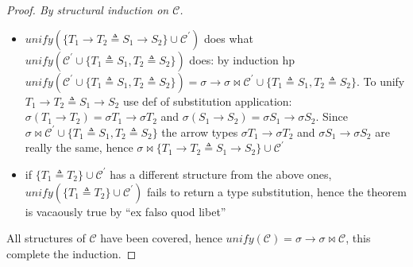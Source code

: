 \documentclass[8pt]{beamer}
\begin{document}
\begin{frame}
\begin{proof}[Proof. By structural induction on $\mathcal{C}$]
\begin{itemize}
            \item $unify(\{T_1 \rightarrow T_2 \triangleq 
                S_1\rightarrow S_2 \} \cup \mathcal{C}^{\prime})$ 
                does what
                $unify(\mathcal{C}^{\prime} \cup \{T_1 \triangleq S_1,
                    T_2 \triangleq S_2\})$ does: by induction hp 
                    $unify(\mathcal{C}^{\prime} \cup \{T_1 \triangleq S_1,
                    T_2 \triangleq S_2\}) = \sigma \rightarrow 
                    \sigma \Join
                    \mathcal{C}^{\prime} \cup \{T_1 \triangleq S_1,
                    T_2 \triangleq S_2\}$. To unify $T_1 \rightarrow 
                    T_2 \triangleq S_1\rightarrow S_2 $ use def of 
                    substitution application: $\sigma 
                    (T_1 \rightarrow T_2 ) = \sigma T_1 \rightarrow 
                    \sigma T_2$ and  $\sigma 
                    (S_1 \rightarrow S_2 ) = \sigma S_1 \rightarrow 
                    \sigma S_2$. Since $\sigma \Join
                    \mathcal{C}^{\prime} \cup \{T_1 \triangleq S_1,
                    T_2 \triangleq S_2\}$ the arrow types 
                    $\sigma T_1 \rightarrow \sigma T_2$ and
                    $\sigma S_1 \rightarrow \sigma S_2$ are really the
                    same, hence
                    $\sigma \Join \{T_1 \rightarrow T_2 \triangleq 
                    S_1\rightarrow S_2 \} \cup \mathcal{C}^{\prime}$
                    
                    \item if $\{T_1 \triangleq T_2\} \cup \mathcal{C}
                        ^{\prime}$ has a different structure 
                        from the above ones, 
                        $unify(\{T_1 \triangleq T_2\} \cup \mathcal{C}
                        ^{\prime})$ fails to return a type substitution,
                        hence the theorem is vacaously true by
                        ``ex falso quod libet''
        \end{itemize}
        All structures of $\mathcal{C}$ have been covered, hence 
        $unify(\mathcal{C})=\sigma \rightarrow \sigma \Join \mathcal{C}$,
        this complete the induction.
    \end{proof}
    \normalsize
\end{frame}
\end{document}
